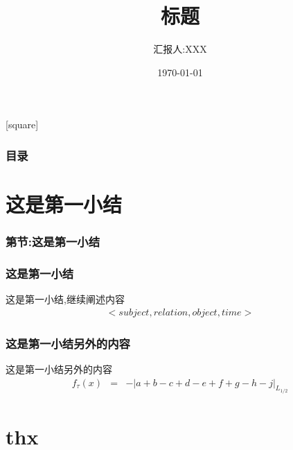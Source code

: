 \documentclass{suesppt}
\begin{document}
    \title[每周组会汇报]{标题}
    \author[汇报人:XXX]{汇报人:XXX}
    \date{\today}
    \begin{frame}
        \titlepage
    \end{frame}
    [square]
    \begin{frame}
        \frametitle{目录}
        \tableofcontents
    \end{frame}

    \section{这是第一小结}
    \begin{frame}
      \frametitle{第\thesection 节:这是第一小结}
      \tableofcontents[currentsection]
    \end{frame}

    \begin{frame}
    \frametitle{这是第一小结}
    
    \hspace{2em}这是第一小结,继续阐述内容
    \begin{eqnarray}
        < subject,relation,object,time>\nonumber
    \end{eqnarray}
    \end{frame}


    \begin{frame}
        \frametitle{这是第一小结另外的内容}
        \hspace{2em}这是第一小结另外的内容
        \begin{eqnarray}
            f_{\tau}\left(x\right)&=&-\left|a+b-c+d-e+f+g-h-j\right|_{L_{1/2}}
        \end{eqnarray}
    \end{frame}

    \section*{thx}
        \begin{frame}
            \begin{center}
                \fontsize{60pt}{\baselineskip}\selectfont {}
            \end{center}
            
            \nocite{*} 
            
        \end{frame}
\end{document}
